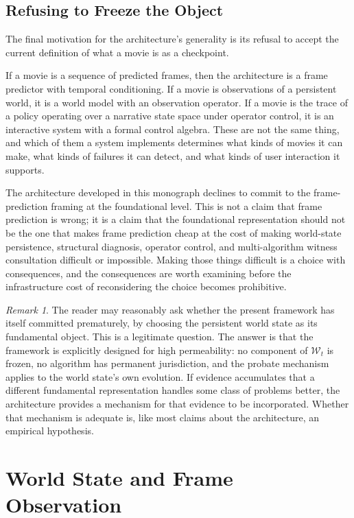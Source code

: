 \documentclass[12pt,a4paper]{article}
\theoremstyle{plain}
\theoremstyle{definition}
\theoremstyle{remark}
\newtheorem{remark}[theorem]{Remark}
\begin{document}
\subsection{Refusing to Freeze the Object}

The final motivation for the architecture's generality is its refusal to accept the current definition of what a movie is as a checkpoint.

If a movie is a sequence of predicted frames, then the architecture is a frame predictor with temporal conditioning. If a movie is observations of a persistent world, it is a world model with an observation operator. If a movie is the trace of a policy operating over a narrative state space under operator control, it is an interactive system with a formal control algebra. These are not the same thing, and which of them a system implements determines what kinds of movies it can make, what kinds of failures it can detect, and what kinds of user interaction it supports.

The architecture developed in this monograph declines to commit to the frame-prediction framing at the foundational level. This is not a claim that frame prediction is wrong; it is a claim that the foundational representation should not be the one that makes frame prediction cheap at the cost of making world-state persistence, structural diagnosis, operator control, and multi-algorithm witness consultation difficult or impossible. Making those things difficult is a choice with consequences, and the consequences are worth examining before the infrastructure cost of reconsidering the choice becomes prohibitive.

\begin{remark}
The reader may reasonably ask whether the present framework has itself committed prematurely, by choosing the persistent world state as its fundamental object. This is a legitimate question. The answer is that the framework is explicitly designed for high permeability: no component of $\mathcal{W}_t$ is frozen, no algorithm has permanent jurisdiction, and the probate mechanism applies to the world state's own evolution. If evidence accumulates that a different fundamental representation handles some class of problems better, the architecture provides a mechanism for that evidence to be incorporated. Whether that mechanism is adequate is, like most claims about the architecture, an empirical hypothesis.
\end{remark}

\section{World State and Frame Observation}
\label{sec:worldstate}
\end{document}
